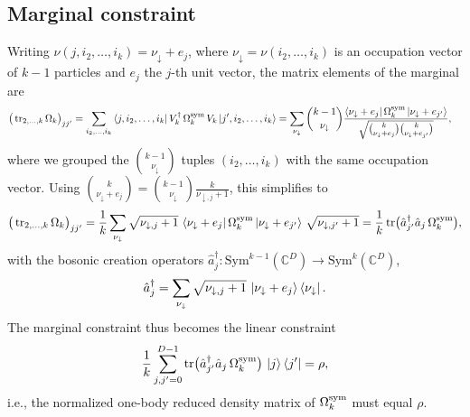 \documentclass[aps,pra,twocolumn,showpacs,superscriptaddress,groupedaddress]{revtex4-2}
\newcommand{\C}{\mathds{C}}
\begin{document}
\begin{widetext}
\subsection{Marginal constraint}
Writing $\nu(j,i_2,\dots,i_k)=\nu_\downarrow+e_j$, where $\nu_\downarrow=\nu(i_2,\dots,i_k)$ is an occupation vector of $k-1$ particles and $e_j$ the $j$-th unit vector, the matrix elements of the marginal are
\begin{align}
    \big(\tr_{2,\dots,k}\Omega_k\big)_{jj'}
    &=\sum_{i_2,\dots,i_k}\bra{j,i_2,\dots,i_k}V_k^\dagger\,\Omega_k^{\rm sym}\,V_k\ket{j',i_2,\dots,i_k}
    =\sum_{\nu_\downarrow}\binom{k-1}{\nu_\downarrow}\frac{\bra{\nu_\downarrow+e_j}\Omega_k^{\rm sym}\ket{\nu_\downarrow+e_{j'}}}{\sqrt{\binom{k}{\nu_\downarrow+e_j}\binom{k}{\nu_\downarrow+e_{j'}}}},
\end{align}
where we grouped the $\binom{k-1}{\nu_\downarrow}$ tuples $(i_2,\dots,i_k)$ with the same occupation vector. Using $\binom{k}{\nu_\downarrow+e_j}=\binom{k-1}{\nu_\downarrow}\frac{k}{\nu_{\downarrow,j}+1}$, this simplifies to
\begin{equation}
    \big(\tr_{2,\dots,k}\Omega_k\big)_{jj'}=\frac1k\sum_{\nu_\downarrow}\sqrt{\nu_{\downarrow,j}+1}\,\bra{\nu_\downarrow+e_j}\Omega_k^{\rm sym}\ket{\nu_\downarrow+e_{j'}}\,\sqrt{\nu_{\downarrow,j'}+1}
    =\frac1k\tr\!\big(\hat a_{j'}^\dagger\hat a_j\,\Omega_k^{\rm sym}\big),
\end{equation}
with the bosonic creation operators $\hat a_j^\dagger:\text{Sym}^{k-1}(\C^D)\to\text{Sym}^k(\C^D)$,
\begin{equation}
    \hat a_j^\dagger=\sum_{\nu_\downarrow}\sqrt{\nu_{\downarrow,j}+1}\,\ket{\nu_\downarrow+e_j}\bra{\nu_\downarrow}.
\end{equation}
The marginal constraint thus becomes the linear constraint
\begin{equation}
    \frac1k\sum_{j,j'=0}^{D-1}\tr\!\big(\hat a_{j'}^\dagger\hat a_j\,\Omega_k^{\rm sym}\big)\,\ket{j}\bra{j'}=\rho,
\end{equation}
i.e., the normalized one-body reduced density matrix of $\Omega_k^{\rm sym}$ must equal $\rho$.


\end{widetext}
\end{document}
